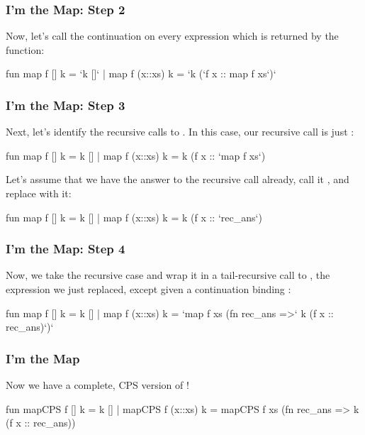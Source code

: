 \documentclass[aspectratio=169]{beamer}
\begin{document}
\begin{frame}[fragile]
  \frametitle{I'm the Map: Step 2}

  Now, let's call the continuation  on every expression which
  is returned by the function: 

  \begin{codeblock}
    fun map f [] k      = `k []`
      | map f (x::xs) k = 
          `k (`f x :: map f xs`)`
  \end{codeblock}
\end{frame}

\begin{frame}[fragile]
  \frametitle{I'm the Map: Step 3}

  Next, let's identify the recursive calls to . In this case, 
  our recursive call  is just :

  \begin{codeblock}
    fun map f [] k      = k []
      | map f (x::xs) k = 
          k (f x :: `map f xs`)
  \end{codeblock}

  \vspace{\fill}

  Let's assume that we have the answer to the recursive call already, call it
  , and replace  with it:

  \begin{codeblock}
    fun map f [] k      = k []
      | map f (x::xs) k = 
          k (f x :: `rec_ans`)
  \end{codeblock}
\end{frame}

\begin{frame}[fragile]
  \frametitle{I'm the Map: Step 4}

  Now, we take the recursive case and wrap it in a tail-recursive call to
  , the expression we just replaced, except given a continuation binding 
  :

  \begin{codeblock}
    fun map f [] k      = k []
      | map f (x::xs) k = 
          `map f xs (fn rec_ans =>` k (f x :: rec_ans)`)`
  \end{codeblock}
\end{frame}

\begin{frame}[fragile]
  \frametitle{I'm the Map}

  Now we have a complete, CPS version of !

  \begin{codeblock}
    fun mapCPS f [] k      = k []
      | mapCPS f (x::xs) k = 
          mapCPS f xs (fn rec_ans => k (f x :: rec_ans))
  \end{codeblock}
\end{frame}
\end{document}
